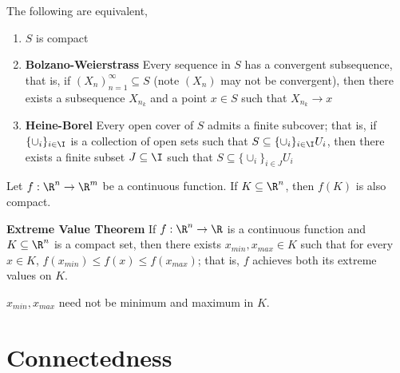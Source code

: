 \documentclass[11pt]{article}
\begin{document}
\begin{theorem*}
  \label{equivalent definition of compactness}
  The following are equivalent,

    \begin{enumerate}
      \item $S$ is compact
      \item \textbf{Bolzano-Weierstrass} Every sequence in $S$ has a convergent subsequence, that is, if $(X_n)_{n=1}^{\infty}\subseteq S$ (note $(X_n)$ may not be convergent), then there exists a subsequence $X_{n_k}$ and a point $x\in S$ such that $X_{n_k} \rightarrow x$
      \item \textbf{Heine-Borel} Every open cover of $S$ admits a finite subcover; that is, if $\{\cup_i\}_{i\in\I}$ is a collection of open sets such that $S\subseteq \{\cup_i\}_{i\in\I}{U_i}$, then there exists a finite subset $J\subseteq \I$ such that $S\subseteq \{\cup_i\}_{i\in J}{U_i}$
    \end{enumerate}

\end{theorem*}


\begin{theorem*}
  \label{continuous preimage of compact sets is compact}
  Let $f: \R^n \rightarrow \R^m$ be a continuous function. If $K\subseteq \R^n$, then $f(K)$ is also compact.
\end{theorem*}


\begin{theorem*}
  \label{extreme value theorem}
  \textbf{Extreme Value Theorem}
  If $f: \R^n \rightarrow \R$ is a continuous function and $K\subseteq \R^n$ is a compact set, then there exists $x_{min}, x_{max} \in K$ such that for every $x\in K$, $f(x_{min}) \leq f(x)\leq f(x_{max})$; that is, $f$ achieves both its extreme values on $K$.

  \begin{rem}
    $x_{min}, x_{max}$ need not be minimum and maximum in $K$.
  \end{rem}
\end{theorem*}


\section*{Connectedness}
\end{document}
